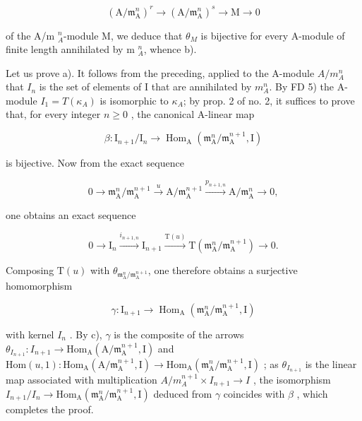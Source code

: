 \[
\left(\mathrm{A} / \mathfrak {m} _ {\mathrm{A}} ^ {n}\right) ^ {r} \longrightarrow \left(\mathrm{A} / \mathfrak {m} _ {\mathrm{A}} ^ {n}\right) ^ {s} \longrightarrow \mathrm{M} \rightarrow 0
\]

of the A/m \(_{A}^{n}\)-module M, we deduce that \(\theta_{M}\) is bijective for every A-module of finite length annihilated by m \(_{A}^{n}\), whence b).

Let us prove a). It follows from the preceding, applied to the A-module \(A/m_{A}^{n}\) that \(I_{n}\) is the set of elements of I that are annihilated by \(m_{A}^{n}\). By FD 5) the A-module \(I_{1} = T(\kappa_{A})\) is isomorphic to \(\kappa_{A}\); by prop. 2 of no. 2, it suffices to prove that, for every integer \(n \geqslant 0\) , the canonical A-linear map

\[
\beta : \mathrm{I} _ {n + 1} / \mathrm{I} _ {n} \longrightarrow \operatorname{Hom} _ {\mathrm{A}} \left(\mathfrak {m} _ {\mathrm{A}} ^ {n} / \mathfrak {m} _ {\mathrm{A}} ^ {n + 1}, \mathrm{I}\right)
\]

is bijective. Now from the exact sequence

\[
0 \longrightarrow \mathfrak {m} _ {\mathrm{A}} ^ {n} / \mathfrak {m} _ {\mathrm{A}} ^ {n + 1} \xrightarrow {u} \mathrm{A} / \mathfrak {m} _ {\mathrm{A}} ^ {n + 1} \xrightarrow {p _ {n + 1 , n}} \mathrm{A} / \mathfrak {m} _ {\mathrm{A}} ^ {n} \longrightarrow 0,
\]

one obtains an exact sequence

\[
0 \longrightarrow \mathrm{I} _ {n} \xrightarrow {i _ {n + 1 , n}} \mathrm{I} _ {n + 1} \xrightarrow {\mathrm{T} (u)} \mathrm{T} (\mathfrak {m} _ {\mathrm{A}} ^ {n} / \mathfrak {m} _ {\mathrm{A}} ^ {n + 1}) \longrightarrow 0.
\]

Composing \(\mathrm{T}(u)\) with \(\theta_{\mathfrak{m}_{\mathrm{A}}^{n} / \mathfrak{m}_{\mathrm{A}}^{n + 1}}\), one therefore obtains a surjective homomorphism

\[
\gamma : \mathrm{I} _ {n + 1} \longrightarrow \operatorname{Hom} _ {\mathrm{A}} (\mathfrak {m} _ {\mathrm{A}} ^ {n} / \mathfrak {m} _ {\mathrm{A}} ^ {n + 1}, \mathrm{I})
\]

with kernel \(I_{n}\) . By c), \(\gamma\) is the composite of the arrows \(\theta_{I_{n+1}}: I_{n+1} \to \mathrm{Hom}_{\mathrm{A}}(\mathrm{A}/\mathfrak{m}_{\mathrm{A}}^{n+1}, \mathrm{I})\) and \(\mathrm{Hom}(u,1): \mathrm{Hom}_{\mathrm{A}}(\mathrm{A}/\mathfrak{m}_{\mathrm{A}}^{n+1}, \mathrm{I}) \longrightarrow \mathrm{Hom}_{\mathrm{A}}(\mathfrak{m}_{\mathrm{A}}^{n}/\mathfrak{m}_{\mathrm{A}}^{n+1}, \mathrm{I})\) ; as \(\theta_{I_{n+1}}\) is the linear map associated with multiplication \(A/m_{A}^{n+1} \times I_{n+1} \longrightarrow I\) , the isomorphism \(I_{n+1}/I_{n} \longrightarrow \mathrm{Hom}_{\mathrm{A}}(\mathfrak{m}_{\mathrm{A}}^{n}/\mathfrak{m}_{\mathrm{A}}^{n+1}, \mathrm{I})\) deduced from \(\gamma\) coincides with \(\beta\) , which completes the proof.

